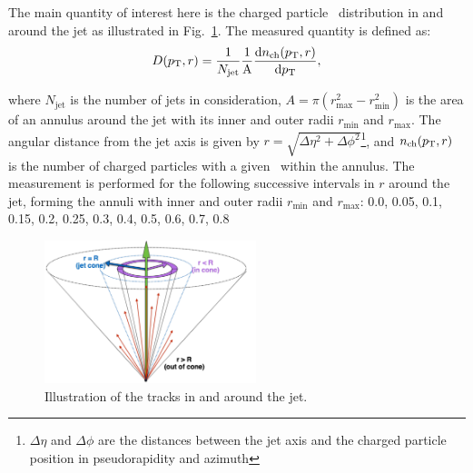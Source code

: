 
The main quantity of interest here is the charged particle \pt\ distribution in and around the jet as illustrated in Fig.~\ref{Fig:dpt_def}. The measured quantity is defined as:
  \begin{equation}
  \mbox{$D( \mbox{$p_{\mathrm{T}}$}, r)$} = \frac{1}{N_{\mathrm{jet}}} \frac{1}{\mathrm{A}} \frac{\mathrm{d} n_{\mathrm{ch}} (\mbox{$p_{\mathrm{T}}$}, r)}{\mathrm{d} \mbox{$p_{\mathrm{T}}$}},
\end{equation}

where $N_{\mathrm{jet}}$ is the number of jets in consideration, $A = \pi (r_{\mathrm{max}}^2 - r_{\mathrm{min}}^2) $ is the area of an annulus around the jet with its inner and outer radii $r_{\mathrm{min}}$ and $r_{\mathrm{max}}$. The angular distance from the jet axis is given by $r = \sqrt{\Delta \eta^2 + \Delta \phi^2}$\footnote{$\Delta \eta$ and $\Delta \phi$ are the distances between the jet axis and the charged particle position in pseudorapidity and azimuth}, and $n_{\mathrm{ch}}(\mbox{$p_{\mathrm{T}}$}, r)$ is the number of charged particles with a given \pt\ within the annulus. The measurement is performed for the following successive intervals in $r$ around the jet, forming the annuli with inner and outer radii $r_{\textrm{min}}$ and $r_{\textrm{max}}$: 0.0, 0.05, 0.1, 0.15, 0.2, 0.25, 0.3, 0.4, 0.5, 0.6, 0.7, 0.8

\begin{figure}
\centerline{
\includegraphics[width=0.55\textwidth]{figures/main/general/fragScheme_Shape.pdf} }
\caption{Illustration of the tracks in and around the jet. }
\label{Fig:dpt_def}
\end{figure}


